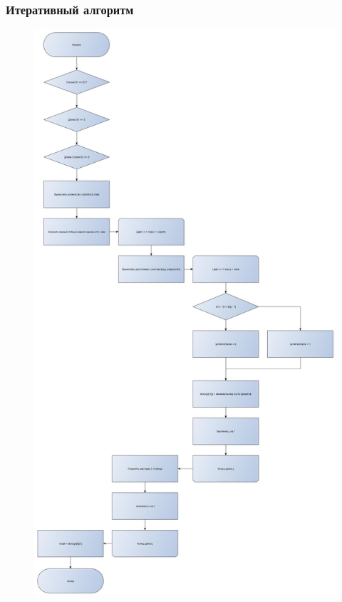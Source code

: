 \documentclass[a4paper, 14pt]{article}
\begin{document}
	\subsubsection{Итеративный алгоритм}
	\begin{figure}
		\centering
		\includegraphics[width=0.7\linewidth]{img/2}
		\caption{}
		\label{fig:2}
	\end{figure}
	
	
\end{document}
